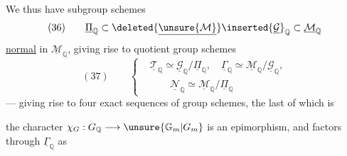 We thus have  subgroup schemes
\[
(36)\qquad \underline{\Pi}_{\mathbb{Q}}\subset
\deleted{\underline{\unsure{\mathcal{M}}}}\inserted{\underline{\mathcal{G}}}_{\mathbb{Q}}
\subset\underline{\mathcal{M}}_{\mathbb{Q}}
\]
\uline{normal} in $\underline{\mathcal{M}}_{\mathbb{Q}}$, giving rise to quotient group schemes
\[
(37)\qquad
\left\{
\begin{aligned}
&\underline{\mathcal{T}}_{\mathbb{Q}}\simeq
\underline{\mathcal{G}}_{\mathbb{Q}}/\underline{\Pi}_{\mathbb{Q}},\quad
\underline{\Gamma}_{\mathbb{Q}}\simeq
\underline{\mathcal{M}}_{\mathbb{Q}}/\underline{\mathcal{G}}_{\mathbb{Q}},\\
&\qquad\underline{\mathcal{N}}_{\mathbb{Q}}\simeq
\underline{\mathcal{M}}_{\mathbb{Q}}/\underline{\Pi}_{\mathbb{Q}}
\end{aligned}
\right.
\]
--- giving rise to four exact sequences of group schemes, the last of which is

 the character $\chi_G:G_{\mathbb{Q}}\longrightarrow \unsure{\mathbb{G}_m|G_m}$ is an epimorphism, and factors through $\underline{\Gamma}_{\mathbb{Q}}$ as
